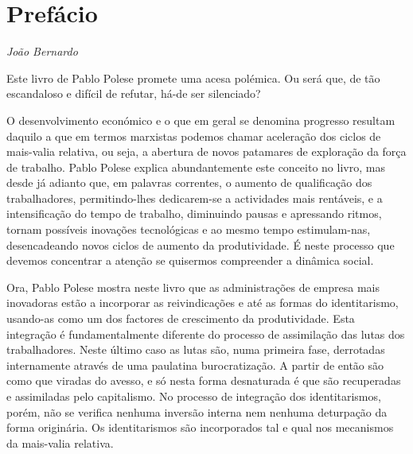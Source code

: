 

\chapter*{Prefácio}

\begin{flushright}
\emph{João Bernardo}
\end{flushright}

Este livro de Pablo Polese promete uma acesa polémica. Ou será que, de
tão escandaloso e difícil de refutar, há-de ser silenciado?

O desenvolvimento económico e o que em geral se denomina progresso
resultam daquilo a que em termos marxistas podemos chamar aceleração dos
ciclos de mais-valia relativa, ou seja, a abertura de novos patamares de
exploração da força de trabalho. Pablo Polese explica abundantemente
este conceito no livro, mas desde já adianto que, em palavras correntes,
o aumento de qualificação dos trabalhadores, permitindo-lhes
dedicarem-se a actividades mais rentáveis, e a intensificação do tempo
de trabalho, diminuindo pausas e apressando ritmos, tornam possíveis
inovações tecnológicas e ao mesmo tempo estimulam-nas, desencadeando
novos ciclos de aumento da produtividade. É neste processo que devemos
concentrar a atenção se quisermos compreender a dinâmica social.

Ora, Pablo Polese mostra neste livro que as administrações de empresa
mais inovadoras estão a incorporar as reivindicações e até as formas do
identitarismo, usando-as como um dos factores de crescimento da
produtividade. Esta integração é fundamentalmente diferente do processo
de assimilação das lutas dos trabalhadores. Neste último caso as lutas
são, numa primeira fase, derrotadas internamente através de uma
paulatina burocratização. A partir de então são como que viradas do
avesso, e só nesta forma desnaturada é que são recuperadas e assimiladas
pelo capitalismo. No processo de integração dos identitarismos, porém,
não se verifica nenhuma inversão interna nem nenhuma deturpação da forma
originária. Os identitarismos são incorporados tal e qual nos mecanismos
da mais-valia relativa.

